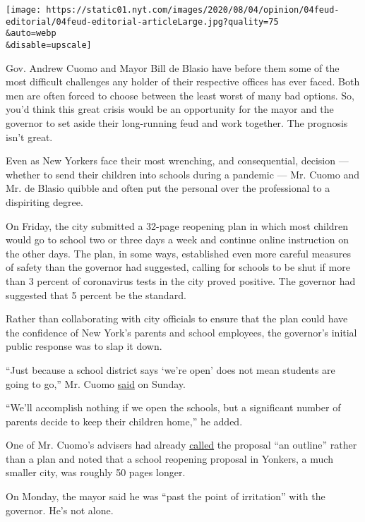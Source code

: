 \texttt{[image: https://static01.nyt.com/images/2020/08/04/opinion/04feud-editorial/04feud-editorial-articleLarge.jpg?quality=75\\\&auto=webp\\\&disable=upscale]}

Gov. Andrew Cuomo and Mayor Bill de Blasio have before them some of the
most difficult challenges any holder of their respective offices has
ever faced. Both men are often forced to choose between the least worst
of many bad options. So, you'd think this great crisis would be an
opportunity for the mayor and the governor to set aside their
long-running feud and work together. The prognosis isn't great.

Even as New Yorkers face their most wrenching, and consequential,
decision --- whether to send their children into schools during a
pandemic --- Mr. Cuomo and Mr. de Blasio quibble and often put the
personal over the professional to a dispiriting degree.

On Friday, the city submitted a 32-page reopening plan in which most
children would go to school two or three days a week and continue online
instruction on the other days. The plan, in some ways, established even
more careful measures of safety than the governor had suggested, calling
for schools to be shut if more than 3 percent of coronavirus tests in
the city proved positive. The governor had suggested that 5 percent be
the standard.

Rather than collaborating with city officials to ensure that the plan
could have the confidence of New York's parents and school employees,
the governor's initial public response was to slap it down.

``Just because a school district says `we're open' does not mean
students are going to go,'' Mr. Cuomo
\href{https://www.nydailynews.com/news/politics/ny-cuomo-de-blasio-schools-reopen-20200802-s3bdp5yix5he7mrxr2uez2cwfu-story.html}{said}
on Sunday.

``We'll accomplish nothing if we open the schools, but a significant
number of parents decide to keep their children home,'' he added.

One of Mr. Cuomo's advisers had already
\href{https://nypost.com/2020/08/02/senior-cuomo-aide-slams-de-blasios-reopening-plan-as-an-outline/}{called}
the proposal ``an outline'' rather than a plan and noted that a school
reopening proposal in Yonkers, a much smaller city, was roughly 50 pages
longer.

On Monday, the mayor said he was ``past the point of irritation'' with
the governor. He's not alone.

